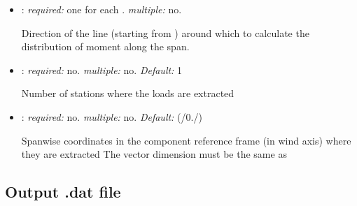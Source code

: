 \begin{itemize}
\item {}: \textit{required:} one for each . 
\textit{multiple:} no.

Direction of the line (starting from ) around which to calculate 
the distribution of moment along the span.

\item {}: \textit{required:} no. \textit{multiple:} no. 
\textit{Default:} 1

Number of stations where the loads are extracted 

\item {}: \textit{required:} no. \textit{multiple:} no. 
\textit{Default:} (/0./)

Spanwise coordinates in the component reference frame (in wind axis) where they are extracted
The vector dimension must be the same as 

\end{itemize}

\subsection{Output .dat file}

